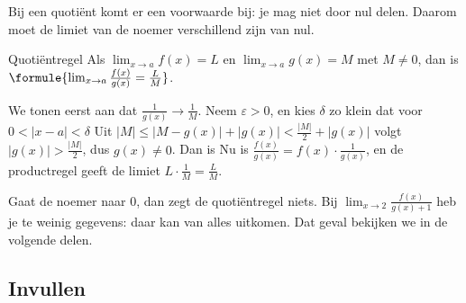 Bij een quotiënt komt er een voorwaarde bij: je mag niet door nul delen. Daarom moet de limiet van de noemer verschillend zijn van nul.

\begin{theorie}
\begin{stelling}{Quotiëntregel}
Als $\lim_{x \to a} f(x) = L$ en $\lim_{x \to a} g(x) = M$ met $M \neq 0$, dan is \quad $\formule{\lim_{x \to a} \frac{f(x)}{g(x)} = \frac{L}{M}}$.
\end{stelling}
\begin{bewijs}
We tonen eerst aan dat $\frac{1}{g(x)} \to \frac{1}{M}$. Neem $\varepsilon > 0$, en kies $\delta$ zo klein dat voor $0 < |x - a| < \delta$
Uit $|M| \leqslant |M - g(x)| + |g(x)| < \frac{|M|}{2} + |g(x)|$ volgt $|g(x)| > \frac{|M|}{2}$, dus $g(x) \neq 0$. Dan is
Nu is $\frac{f(x)}{g(x)} = f(x) \cdot \frac{1}{g(x)}$, en de productregel geeft de limiet $L \cdot \frac1M = \frac{L}{M}$.
\end{bewijs}
\end{theorie}


Gaat de noemer naar $0$, dan zegt de quotiëntregel niets. Bij $\lim_{x \to 2} \frac{f(x)}{g(x) + 1}$ heb je te weinig gegevens: daar kan van alles uitkomen. Dat geval bekijken we in de volgende delen.

\begin{oefeningen}
\end{oefeningen}

\subsection{Invullen}

